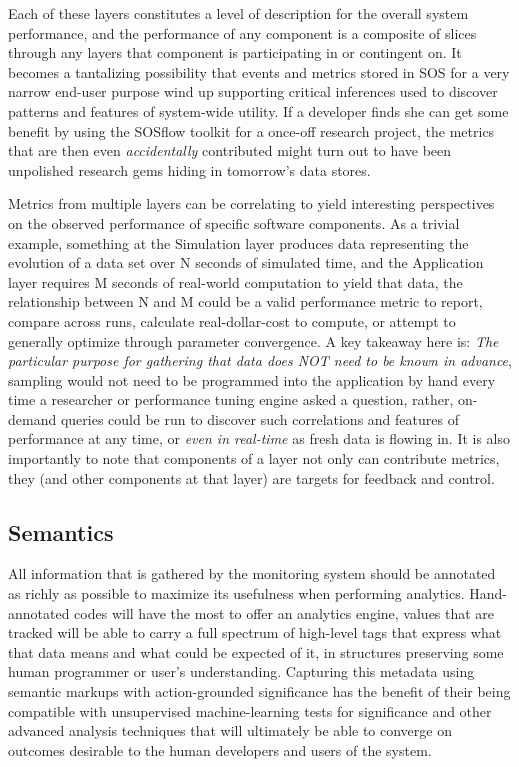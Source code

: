 Each of these layers constitutes a level of description for the
overall system performance, and the performance of any component is a
composite of slices through any layers that component is participating
in or contingent on. It becomes a tantalizing possibility that events
and metrics stored in SOS for a very narrow end-user purpose wind up
supporting critical inferences used to discover patterns and features
of system-wide utility. If a developer finds she can get some benefit
by using the SOSflow toolkit for a once-off research project, the
metrics that are then even \textit{accidentally} contributed might
turn out to have been unpolished research gems hiding in tomorrow's data
stores.

Metrics from multiple layers can be correlating to yield interesting
perspectives on the observed performance of specific software
components.  As a trivial example, something at the Simulation layer
produces data representing the evolution of a data set over N seconds
of simulated time, and the Application layer requires M seconds of
real-world computation to yield that data, the relationship between N
and M could be a valid performance metric to report, compare across
runs, calculate real-dollar-cost to compute, or attempt to generally
optimize through parameter convergence. A key takeaway here
is: \textit{The particular purpose for gathering that data does NOT
need to be known in advance}, sampling would not need to be programmed
into the application by hand every time a researcher or performance
tuning engine asked a question, rather, on-demand queries could be run
to discover such correlations and features of performance at any time,
or \textit{even in real-time} as fresh data is flowing in. It is also
importantly to note that components of a layer not only can contribute
metrics, they (and other components at that layer) are targets for
feedback and control.


\subsection{Semantics}

All information that is gathered by the monitoring system should be
annotated as richly as possible to maximize its usefulness when
performing analytics.  Hand-annotated codes will have the most to
offer an analytics engine, values that are tracked will be able to
carry a full spectrum of high-level tags that express what that data
means and what could be expected of it, in structures preserving
some human programmer or user's understanding. Capturing this metadata
using semantic markups with action-grounded significance has the
benefit of their being compatible with unsupervised machine-learning
tests for significance and other advanced analysis techniques that
will ultimately be able to converge on outcomes desirable to the human
developers and users of the system.

